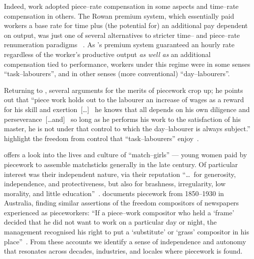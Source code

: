 \documentclass[trackingWork]{subfiles}
\begin{document}
Indeed, work adopted piece--rate compensation in some aspects and
time--rate compensation in others.
The Rowan premium system,
which essentially paid workers
a base rate for time plus
(the potential for) an additional pay dependent on output,
was just one of several alternatives to stricter time-- and piece--rate renumeration paradigms%
~\cite{rowan1901premium}.
As \citeauthor{rowan1901premium}'s premium system guaranteed an hourly rate
regardless of the worker's productive output
\textit{as well as} an additional compensation tied to performance,
workers under this regime were
in some senses ``task--labourers'', and
in other senses (more conventional) ``day--labourers''.

Returning to
\citeauthor{hughRaynbirdTaskWork}, several arguments for the merits of piecework
crop up; he points out that 
``piece work holds out to the labourer an increase of wages as a reward for his skill and exertion~[\dots]~
he knows that all depends on his own diligence and perseverance~[\dots and]~
so long as he performs his work to the satisfaction of his master,
he is not under that control to which the day--labourer is always subject.''
\citeauthor{hughRaynbirdTaskWork} highlight the freedom from control that ``task--labourers'' enjoy~\cite{hughRaynbirdTaskWork,rowan1901premium}.

\citeauthor{10.2307/3827491} offers a look into the lives and culture of ``match--girls''
--- young women paid by piecework to assemble matchsticks generally in the late  century.
Of particular interest was their independent nature, via their reputation ``\dots~for generosity, independence, and protectiveness,
but also for brashness, irregularity, low morality, and little education''~\cite{10.2307/3827491}.
\citeauthor{10.2307/27508091} documents piecework from 1850--1930 in Australia,
finding similar assertions of the freedom compositors of newspapers experienced as pieceworkers:
``If a piece--work compositor who held a `frame' decided that he did not want to work on a particular day or night,
the management recognised his right to put a `substitute' or `grass' compositor in his place''~\cite{10.2307/27508091}.
From these accounts we identify a sense of independence and autonomy that resonates across decades, industries, and locales where piecework is found.
\end{document}
